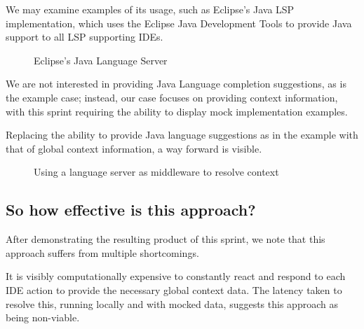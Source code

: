 We may examine examples of its usage, such as Eclipse's Java LSP implementation, which uses the Eclipse Java Development Tools to provide Java support to all LSP supporting IDEs.

\begin{figure}[h!]
	
	
	\caption{Eclipse's Java Language Server}
	
\end{figure}

We are not interested in providing Java Language completion suggestions, as is the example case; instead, our case focuses on providing context information, with this sprint requiring the ability to display mock implementation examples.

Replacing the ability to provide Java language suggestions as in the example with that of global context information, a way forward is visible.

\begin{figure}[h!]
	
	\caption{Using a language server as middleware to resolve context}
\end{figure}



\subsection{So how effective is this approach?}

After demonstrating the resulting product of this sprint, we note that this approach suffers from multiple shortcomings.

It is visibly computationally expensive to constantly react and respond to each IDE action to provide the necessary global context data. The latency taken to resolve this, running locally and with mocked data, suggests this approach as being non-viable. 

